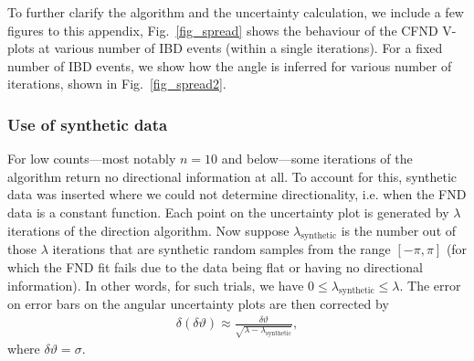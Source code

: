 \documentclass[tightenlines,twocolumn,prl,notitlepage,nofootinbib,preprintnumbers,longbibliography]{revtex4-1}
\begin{document}
To further clarify the algorithm and the uncertainty calculation, we include a few figures to this appendix, Fig.~\ref{fig_spread} shows the behaviour of the CFND V-plots at various number of IBD events (within a single iterations).
For a fixed number of IBD events, we show how the angle is inferred for various number of iterations, shown in Fig.~\ref{fig_spread2}.

\subsubsection{Use of synthetic data}
For low counts---most notably $n=10$ and below---some iterations of the algorithm return no directional information at all. To account for this, synthetic data was inserted where we could not determine directionality, i.e. when the FND data is a constant function. Each point on the uncertainty plot is generated by $\lambda$ iterations of the direction algorithm. Now suppose $\lambda_\mathrm{synthetic}$ is the number out of those $\lambda$ iterations that are synthetic random samples from the range $[-\pi,\pi]$ (for which the FND fit fails due to the data being flat or having no directional information). 
In other words, for such trials, we have $0 \leq \lambda_\mathrm{synthetic} \leq \lambda$. The error on error bars on the angular uncertainty plots are then corrected by 
\begin{align}
\delta(\delta\vartheta)\approx\frac{\delta\vartheta}{\sqrt{\lambda-\lambda_\mathrm{synthetic}}},
\end{align}
where $\delta\vartheta=\sigma$.
\end{document}
